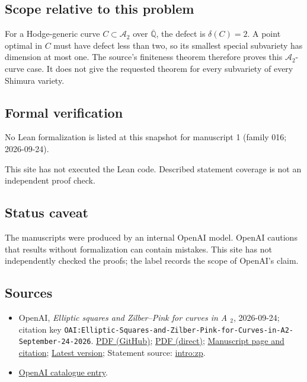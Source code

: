\documentclass[11pt]{article}
\begin{document}
\subsection{Scope relative to this problem}
For a Hodge-generic curve $C\subset\mathcal A_2$ over $\overline{\mathbb Q}$, the defect is $\delta(C)=2$. A point optimal in $C$ must have defect less than two, so its smallest special subvariety has dimension at most one. The source's finiteness theorem therefore proves this $\mathcal A_2$-curve case. It does not give the requested theorem for every subvariety of every Shimura variety.

\subsection{Formal verification}
No Lean formalization is listed at this snapshot for manuscript 1 (family 016; 2026-09-24).

This site has not executed the Lean code. Described statement coverage is not an independent proof check.

\subsection{Status caveat}
The manuscripts were produced by an internal OpenAI model. OpenAI cautions that results without formalization can contain mistakes. This site has not independently checked the proofs; the label records the scope of OpenAI's claim.

\subsection{Sources}
\begin{itemize}
\item OpenAI, \emph{Elliptic squares and Zilber–Pink for curves in A \({}_{2}\)}, 2026-09-24; citation key \texttt{OAI:Elliptic-Squares-and-Zilber-Pink-for-Curves-in-A2-September-24-2026}. \href{https://github.com/openai/math/blob/adc7f1241b42e322a6451854ab7e4b4c146bf78a/preprints/Elliptic-Squares-and-Zilber-Pink-for-Curves-in-A2-September-24-2026/paper.pdf}{PDF (GitHub)}; \href{https://github.com/openai/math/raw/adc7f1241b42e322a6451854ab7e4b4c146bf78a/preprints/Elliptic-Squares-and-Zilber-Pink-for-Curves-in-A2-September-24-2026/paper.pdf}{PDF (direct)}; \href{https://github.com/openai/math/blob/adc7f1241b42e322a6451854ab7e4b4c146bf78a/preprints/Elliptic-Squares-and-Zilber-Pink-for-Curves-in-A2-September-24-2026/README.md}{Manuscript page and citation}; \href{https://github.com/openai/math/blob/main/preprints/Elliptic-Squares-and-Zilber-Pink-for-Curves-in-A2-September-24-2026/paper.pdf}{Latest version}; Statement source: \href{https://github.com/openai/math/blob/adc7f1241b42e322a6451854ab7e4b4c146bf78a/preprints/Elliptic-Squares-and-Zilber-Pink-for-Curves-in-A2-September-24-2026/build/sections/01-introduction.tex\#L66}{intro:zp}.
\item \href{https://github.com/openai/math/blob/adc7f1241b42e322a6451854ab7e4b4c146bf78a/CONTENTS.md}{OpenAI catalogue entry}.
\end{itemize}
\end{document}
